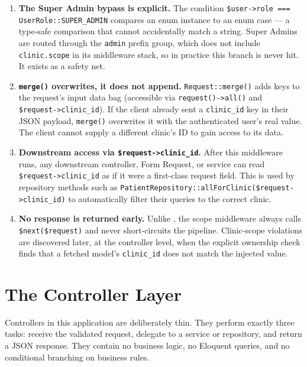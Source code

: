 \begin{enumerate}
  \item \textbf{The Super Admin bypass is explicit.}
    The condition \texttt{\$user->role === UserRole::SUPER\_ADMIN}
    compares an enum instance to an enum case --- a type-safe comparison
    that cannot accidentally match a string. Super Admins are routed
    through the \texttt{admin} prefix group, which does not include
    \texttt{clinic.scope} in its middleware stack, so in practice this
    branch is never hit. It exists as a safety net.

  \item \textbf{\texttt{merge()} overwrites, it does not append.}
    \texttt{Request::merge()} adds keys to the request's input data
    bag (accessible via \texttt{request()->all()} and
    \texttt{\$request->clinic\_id}). If the client already sent a
    \texttt{clinic\_id} key in their JSON payload, \texttt{merge()}
    overwrites it with the authenticated user's real value. The client
    cannot supply a different clinic's ID to gain access to its data.

  \item \textbf{Downstream access via \texttt{\$request->clinic\_id}.}
    After this middleware runs, any downstream controller, Form Request,
    or service can read \texttt{\$request->clinic\_id} as if it were
    a first-class request field. This is used by repository methods such
    as \texttt{PatientRepository::allForClinic(\$request->clinic\_id)}
    to automatically filter their queries to the correct clinic.

  \item \textbf{No response is returned early.}
    Unlike , the scope middleware always calls
    \texttt{\$next(\$request)} and never short-circuits the pipeline.
    Clinic-scope violations are discovered later, at the controller
    level, when the explicit ownership check finds that a fetched
    model's \texttt{clinic\_id} does not match the injected value.
\end{enumerate}

\section{The Controller Layer}
\label{sec:controller-layer}

Controllers in this application are deliberately thin. They perform
exactly three tasks: receive the validated request, delegate to a
service or repository, and return a JSON response. They contain no
business logic, no Eloquent queries, and no conditional branching on
business rules.

